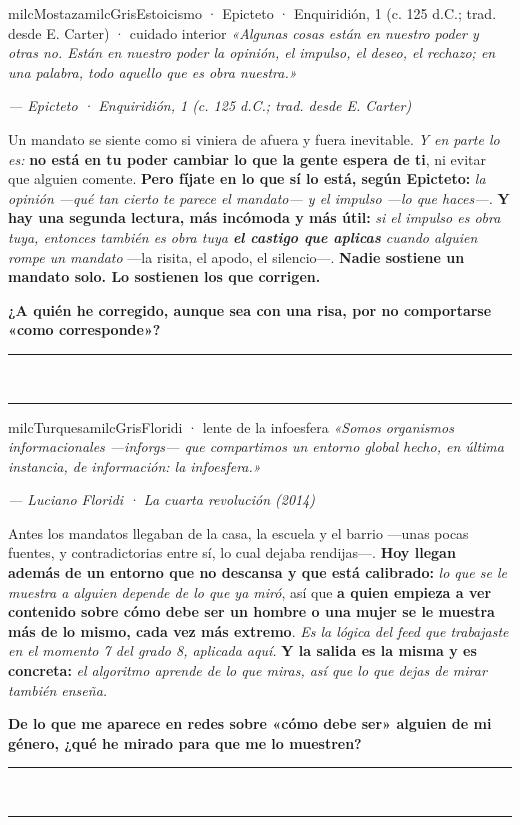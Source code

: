 \documentclass[11pt,letterpaper]{article}
\newcommand{\linead}[1]{\noindent\color{milcLinea}\rule{#1}{0.5pt}\color{milcNegro}}
\begin{document}
\begin{softbox}{milcMostaza}{milcGris}{Estoicismo · Epicteto · Enquiridión, 1 (c. 125 d.C.; trad. desde E. Carter) · cuidado interior}
\textit{«Algunas cosas están en nuestro poder y otras no. Están en nuestro poder la opinión, el impulso, el deseo, el rechazo; en una palabra, todo aquello que es obra nuestra.»}

{\footnotesize\itshape\color{milcNegro!70}--- Epicteto · Enquiridión, 1 (c. 125 d.C.; trad. desde E. Carter)}

Un mandato se siente como si viniera de afuera y fuera inevitable. \emph{Y en parte lo es:} \textbf{no está en tu poder cambiar lo que la gente espera de ti}, ni evitar que alguien comente. \textbf{Pero fíjate en lo que sí lo está, según Epicteto:} \emph{la opinión ---qué tan cierto te parece el mandato--- y el impulso ---lo que haces---.} \textbf{Y hay una segunda lectura, más incómoda y más útil:} \emph{si el impulso es obra tuya, entonces también es obra tuya \textbf{el castigo que aplicas} cuando alguien rompe un mandato} ---la risita, el apodo, el silencio---. \textbf{Nadie sostiene un mandato solo. Lo sostienen los que corrigen.}

\textbf{¿A quién he corregido, aunque sea con una risa, por no comportarse «como corresponde»?}
\end{softbox}
\linead{\linewidth}\\[1mm]
\linead{\linewidth}

\begin{softbox}{milcTurquesa}{milcGris}{Floridi · lente de la infoesfera}
\textit{«Somos organismos informacionales ---inforgs--- que compartimos un entorno global hecho, en última instancia, de información: la infoesfera.»}

{\footnotesize\itshape\color{milcNegro!70}--- Luciano Floridi · La cuarta revolución (2014)}

Antes los mandatos llegaban de la casa, la escuela y el barrio ---unas pocas fuentes, y contradictorias entre sí, lo cual dejaba rendijas---. \textbf{Hoy llegan además de un entorno que no descansa y que está calibrado:} \emph{lo que se le muestra a alguien depende de lo que ya miró}, así que \textbf{a quien empieza a ver contenido sobre cómo debe ser un hombre o una mujer se le muestra más de lo mismo, cada vez más extremo}. \emph{Es la lógica del feed que trabajaste en el momento 7 del grado 8, aplicada aquí.} \textbf{Y la salida es la misma y es concreta:} \emph{el algoritmo aprende de lo que miras, así que lo que dejas de mirar también enseña.}

\textbf{De lo que me aparece en redes sobre «cómo debe ser» alguien de mi género, ¿qué he mirado para que me lo muestren?}
\end{softbox}
\linead{\linewidth}\\[1mm]
\linead{\linewidth}
\end{document}
